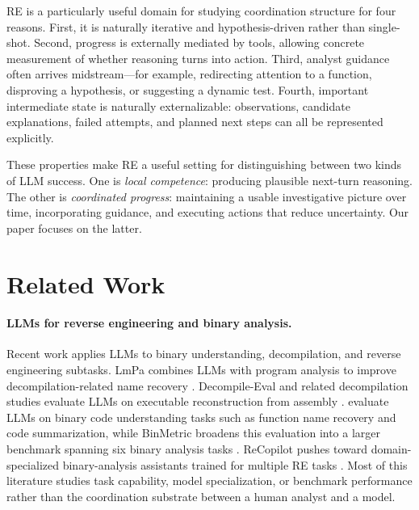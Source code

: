 \documentclass[letterpaper]{article}
\begin{document}
RE is a particularly useful domain for studying coordination structure for four reasons.
First, it is naturally iterative and hypothesis-driven rather than single-shot.
Second, progress is externally mediated by tools, allowing concrete measurement of whether reasoning turns into action.
Third, analyst guidance often arrives midstream---for example, redirecting attention to a function, disproving a hypothesis, or suggesting a dynamic test.
Fourth, important intermediate state is naturally externalizable: observations, candidate explanations, failed attempts, and planned next steps can all be represented explicitly.

These properties make RE a useful setting for distinguishing between two kinds of LLM success.
One is \emph{local competence}: producing plausible next-turn reasoning.
The other is \emph{coordinated progress}: maintaining a usable investigative picture over time, incorporating guidance, and executing actions that reduce uncertainty.
Our paper focuses on the latter.

\section{Related Work}

\paragraph{LLMs for reverse engineering and binary analysis.}
Recent work applies LLMs to binary understanding, decompilation, and reverse engineering subtasks.
LmPa combines LLMs with program analysis to improve decompilation-related name recovery \citep{xu2023lmpa}.
Decompile-Eval and related decompilation studies evaluate LLMs on executable reconstruction from assembly \citep{feng2024decompile}.
\citet{shang2025binaryunderstanding} evaluate LLMs on binary code understanding tasks such as function name recovery and code summarization, while BinMetric broadens this evaluation into a larger benchmark spanning six binary analysis tasks \citep{shang2025binmetric}.
ReCopilot pushes toward domain-specialized binary-analysis assistants trained for multiple RE tasks \citep{chen2025recopilot}.
Most of this literature studies task capability, model specialization, or benchmark performance rather than the coordination substrate between a human analyst and a model.
\end{document}
